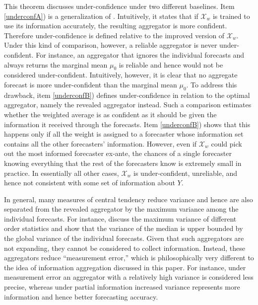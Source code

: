 \documentclass[11pt]{article}
\theoremstyle{definition}
\theoremstyle{definition}
\begin{document}
This theorem discusses under-confidence under two different baselines. Item \ref{underconfA}) is a generalization of \citet[Theorem 2.1.]{Ranjan08}. Intuitively, it states that if $\mathcal{X}_w$ is trained to use its information accurately, the resulting aggregator is more confident. Therefore under-confidence is defined relative to the improved version of  $\mathcal{X}_w$. Under this kind of comparison, however, a reliable aggregator is never under-confident. For instance, an aggregator that ignores the individual forecasts and always returns the marginal mean $\mu_0$ is reliable and hence would not be considered under-confident. Intuitively, however, it is clear that no aggregate forecast is more under-confident than the marginal mean $\mu_0$. To address this drawback, item \ref{underconfB}) defines under-confidence in relation to the optimal aggregator, namely the revealed aggregator instead. Such a comparison estimates whether the weighted average is as confident as it should be given the information it received through the forecasts. Item \ref{underconfB}) shows that this happens only if all the weight is assigned to a forecaster whose information set contains all the other forecasters' information. However, even if $\mathcal{X}_w$ could pick out the most informed forecaster ex-ante, the chances of a single forecaster knowing everything that the rest of the forecasters know is extremely small in practice. In essentially all other cases, $\mathcal{X}_w$ is under-confident, unreliable,  
and hence not consistent with some set of information about $Y$. 

In general, many measures of central tendency reduce variance and hence are also separated from the revealed aggregator by the maximum variance among the individual forecasts. For instance, \cite{papadatos1995maximum} discuss the maximum variance of different order statistics and show that the variance of the median is upper bounded by the global variance of the individual forecasts. Given that such aggregators are not expanding, they cannot be considered to collect information. 
 Instead, these aggregators reduce ``measurement error,'' which is philosophically very different to the idea of information aggregation discussed in this paper. For instance, under measurement error an aggregator with a relatively high variance is  considered less precise, whereas under partial information increased variance represents more information and hence better forecasting accuracy.
\end{document}

